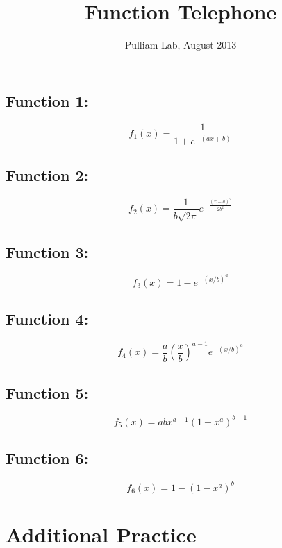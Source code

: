 \documentclass[12pt]{article}
\title{Function Telephone}
\author{Pulliam Lab, August 2013}
\date{}                                           %
\begin{document}
\maketitle

\subsection*{Function 1:}
$$
f_1(x) = \frac{1}{1+e^{-(ax+b)}}
$$

\subsection*{Function 2:}
$$
f_2(x) = \frac{1}{b \sqrt{2\pi}}e^{-\frac{(x-a)^2}{2b^2}}
$$

\subsection*{Function 3:}
$$
f_3(x) = 1-e^{-(x/b)^a}
$$

\subsection*{Function 4:}
$$
f_4(x) = \frac{a}{b}\left(\frac{x}{b}\right)^{a-1} e^{-(x/b)^a}
$$

\subsection*{Function 5:}
$$
f_5(x) =abx^{a-1}(1-x^a)^{b-1}
$$

\subsection*{Function 6:}
$$
f_6(x) =  1-(1-x^a)^b
$$

\clearpage
\section*{Additional Practice\\}
\end{document}

